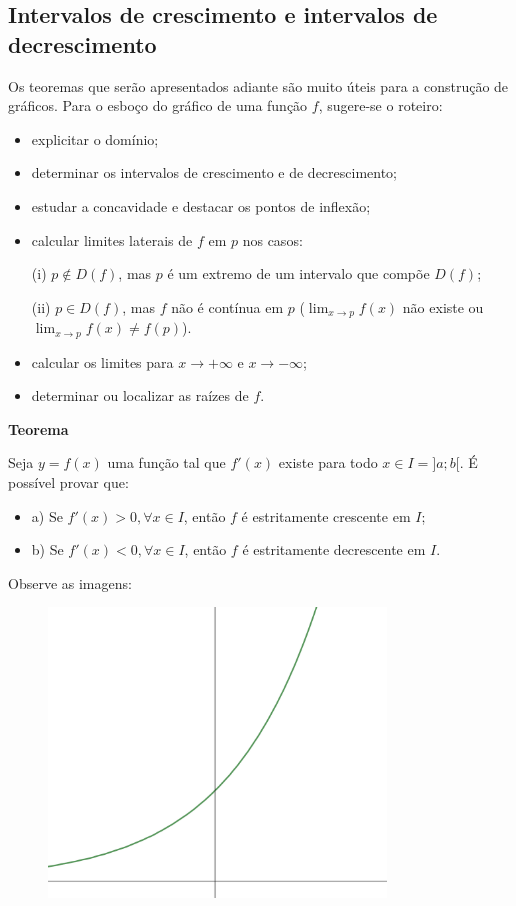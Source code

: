 \documentclass{article}
\begin{document}
{\begin{newpage}
\subsection{Intervalos de crescimento e intervalos de decrescimento}
\hspace{12pt} Os teoremas que serão apresentados adiante são muito úteis para a construção de gráficos. Para o esboço do gráfico de uma função $f$, sugere-se o roteiro:
\begin{itemize}
\item explicitar o domínio;
\item determinar os intervalos de crescimento e de decrescimento;
\item estudar a concavidade e destacar os pontos de inflexão;
\item calcular limites laterais de $f$ em $p$ nos casos:
\par
\hspace{12pt} (i) $p\notin D(f)$, mas $p$ é um extremo de um intervalo que compõe $D(f)$;
\par
\hspace{12pt} (ii) $p\in D(f)$, mas $f$ não é contínua em $p$ ($\displaystyle{\lim_{x\to p} f(x)}$ não existe ou $\displaystyle{\lim_{x\to p} f(x)} \neq f(p)$).
\item calcular os limites para $x\rightarrow +\infty $ e $x\rightarrow -\infty $;
\item determinar ou localizar as raízes de $f$.
\end{itemize}
\par
\vspace{0.3cm}
\textbf{Teorema}
\par Seja $y=f(x)$ uma função tal que $f'(x)$ existe para todo $x\in I = ]a;b[$. É possível provar que:
\begin{itemize}
\item a) Se $f'(x)>0,  \forall x\in I$, então $f$ é estritamente crescente em $I$;
\item b) Se $f'(x)<0,  \forall x\in I$, então $f$ é estritamente decrescente em $I$.
\end{itemize}
\par Observe as imagens:
\begin{figure}[htbp]
\begin{center}
\includegraphics[width=0.8\textwidth, angle=0]{Grafico2.png}

\end{center}
\end{figure}
\end{newpage}}
\end{document}
